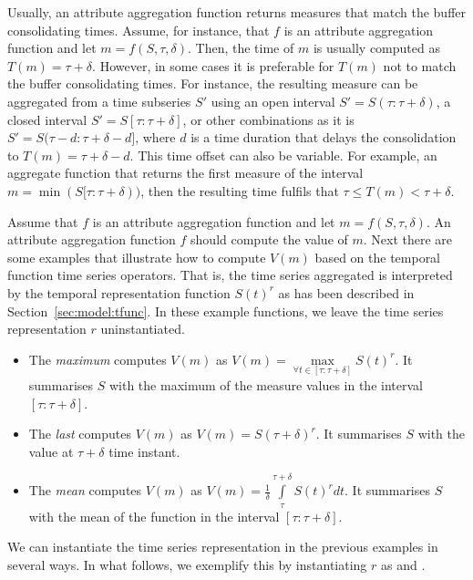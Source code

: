 Usually, an attribute aggregation function returns measures that match
the buffer consolidating times. Assume, for instance, that $f$ is an
attribute aggregation function and let $m=f(S,\tau,\delta)$.  Then,
the time of $m$ is usually computed as $T(m)=\tau+\delta$.  However,
in some cases it is preferable for $T(m)$ not to match the buffer
consolidating times. For instance, the resulting measure can be
aggregated from a time subseries $S'$ using an open interval
$S'=S(\tau:\tau+\delta)$, a closed interval $S'=S[\tau:\tau+\delta]$,
or other combinations as it is $S'=S(\tau-d:\tau+\delta-d]$, where $d$
is a time duration that delays the consolidation to
$T(m)=\tau+\delta-d$.  This time offset can also be variable. For
example, an aggregate function that returns the first measure of the
interval $m=\min(S[\tau:\tau+\delta))$, then the resulting time
fulfils that $\tau\leq T(m) < \tau+\delta$.

Assume that $f$ is an attribute aggregation function and let
$m=f(S,\tau,\delta)$.  An attribute aggregation function $f$ should
compute the value of $m$. Next there are some examples that illustrate
how to compute $V(m)$ based on the temporal function time series
operators.  That is, the time series aggregated is interpreted by the
temporal representation function $S(t)^r$ as has been described in
Section~\ref{sec:model:tfunc}. In these example functions, we leave
the time series representation $r$ uninstantiated.

\begin{itemize}

\item The \emph{maximum} computes $V(m)$ as $V(m) =
  \max\limits_{\forall t \in [\tau:\tau+\delta]} S(t)^r$. It
  summarises $S$ with the maximum of the measure values in the
  interval $[\tau:\tau+\delta]$.

\item The \emph{last} computes $V(m)$ as $V(m) = S(\tau+\delta)^r$. It
  summarises $S$ with the value at $\tau+\delta$ time instant.

\item The \emph{mean} computes $V(m)$ as $V(m) = \frac{1}{\delta}
  \int\limits_{\tau}^{\tau+\delta} S(t)^r dt$. It summarises $S$ with
  the mean of the function in the interval $[\tau:\tau+\delta]$.

\end{itemize}

We can instantiate the time series representation in the previous
examples in several ways. In what follows, we exemplify this by
instantiating $r$ as \dd{} and \zohe{}.

